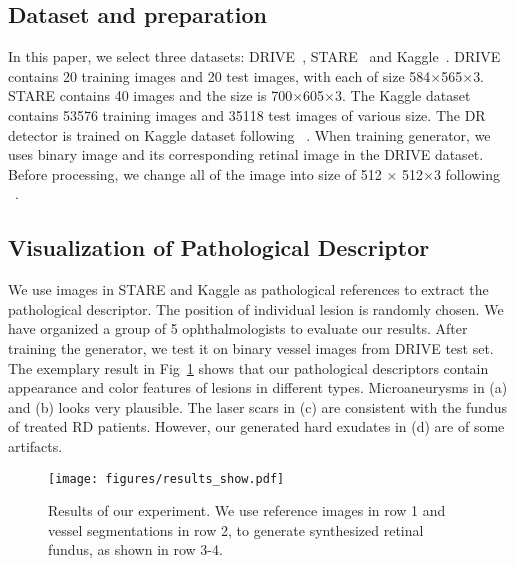 \documentclass[letterpaper]{article} %
\begin{document}
	\subsection{Dataset and preparation}
	In this paper, we select three datasets: DRIVE~\cite{staal:2004-855}, STARE~\cite{hoover2000locating} and Kaggle~\cite{kaggle2016diabetic}.
	DRIVE contains 20 training images and 20 test images, with each of size 584$\times$565$\times$3. STARE contains 40  images and the size is 700$\times$605$\times$3. The Kaggle dataset contains 53576 training images and 35118 test images of various size. The DR detector is trained on Kaggle dataset following ~\cite{oO2016detector}. When training generator, we uses binary image and its corresponding retinal image in the DRIVE dataset. Before processing, we change all of the image into size of 512 $\times$ 512$\times$3 following ~\cite{zhao2018synthesizing}.%


    \subsection{Visualization of Pathological Descriptor}

    We use images in STARE and Kaggle as pathological references to extract the pathological descriptor. The position of individual lesion is randomly chosen.  We have organized a group of 5 ophthalmologists to evaluate our results.
    After training the generator, we test it on binary vessel images from DRIVE test set. The exemplary result in Fig~\ref{fig:results_show} shows that our pathological descriptors contain appearance and color features of lesions in different types. Microaneurysms in (a) and (b) looks very plausible.  The laser scars in (c) are consistent with the fundus of treated RD patients. However, our generated hard exudates in (d) are of some artifacts.

	\begin{figure}[t]
		\begin{center}
			\texttt{[image: figures/results\_show.pdf]}
		\end{center}
		\caption{Results of our experiment. We use reference images in row 1 and vessel segmentations in row 2, to generate synthesized retinal fundus, as shown in row 3-4.}
		\label{fig:results_show}
	\end{figure}
\end{document}
